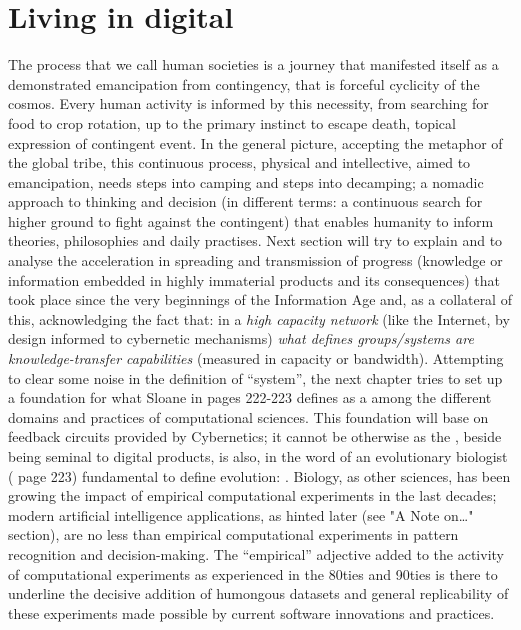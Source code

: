 \documentclass[14pt,a4paper]{extarticle}
\begin{document}
\section*{Living in digital}%
\label{sec:digital}%

\hspace*{15mm}The process that we call human societies is a journey that manifested itself as a demonstrated emancipation from contingency, that is forceful cyclicity of the cosmos. Every human activity is informed by this necessity, from searching for food to crop rotation, up to the primary instinct to escape death, topical expression of contingent event.
\newline
In the general picture, accepting the metaphor of the global tribe, this continuous process, physical and intellective, aimed to emancipation, needs steps into camping and steps into decamping; a nomadic approach to thinking and decision (in different terms: a continuous search for higher ground to fight against the contingent) that enables humanity to inform theories, philosophies and daily practises.
\newline
\hspace*{15mm}Next section will try to explain and to analyse the acceleration in spreading and transmission of progress (knowledge or information embedded in highly immaterial products and its consequences) that took place since the very beginnings of the Information Age and, as a collateral of this, acknowledging the fact that: in a \textit{high capacity network} (like the Internet, by design informed to cybernetic mechanisms) \textit{what defines groups/systems are knowledge-transfer capabilities} (measured in capacity or bandwidth). Attempting to clear some noise in the definition of “system”, the next chapter tries to set up a foundation for what Sloane in \cite{SLOANdarwin} pages 222-223 defines as a  among the different domains and practices of computational sciences. This foundation will base on feedback circuits provided by Cybernetics; it cannot be otherwise as the , beside being seminal to digital products, is also, in the word of an evolutionary biologist (\cite{SLOANdarwin} page 223) fundamental to define evolution: . Biology, as other sciences, has been growing the impact of empirical computational experiments in the last decades; modern artificial intelligence applications, as hinted later (see "A Note on…" section), are no less than empirical computational experiments in pattern recognition and decision-making. The “empirical” adjective added to the activity of computational experiments as experienced in the 80ties and 90ties is there to underline the decisive addition of humongous datasets and general replicability of these experiments made possible by current software innovations and practices.
\end{document}
